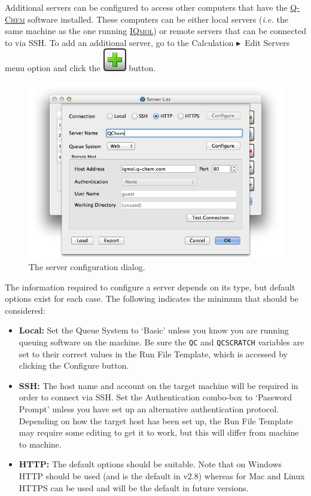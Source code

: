 \documentclass[a4paper,12pt]{article}
\newcommand{\qchem}{\href{http://q-chem.com}{{\scshape Q-Chem}}}
\newcommand{\iqmol}{\href{http://iqmol.org}{{\scshape IQmol}}}
\newcommand{\bt}{\ensuremath{\blacktriangleright}}
\begin{document}
Additional servers can be configured to access other computers that have the
\qchem{} software installed.  These computers can be either local servers
(\emph{i.e.} the same machine as the one running \iqmol{}) or remote servers
that can be connected to via SSH.  To add an additional server, go to the
Calculation \bt\ Edit Servers menu option and click the
\includegraphics[scale=0.40]{figures/PlusButton.png} button.  
\begin{figure}
\begin{center}
\includegraphics[scale=0.5]{figures/ServerDialog.png}
\caption{The server configuration dialog.}
\end{center}
\end{figure}

The information required to configure a server depends on its type, but default
options exist for each case.  The following indicates the minimum that should
be considered:

\begin{itemize}
\item {\bf Local:} Set the Queue System to `Basic'
      unless you know you are running queuing software on the machine.
      Be sure the {\tt QC} and {\tt QCSCRATCH} variables are set to their correct
	  values in the Run File Template, which is accessed by clicking the Configure
      button.
\item {\bf SSH:} The host name and account on the target machine will 
      be required in order to connect via SSH.  Set the Authentication combo-box to
      `Password Prompt' unless you have set up an alternative authentication protocol.
	  Depending on how the target host has been set up, the Run File Template
	  may require some editing to get it to work, but this will differ from
      machine to machine.
\item {\bf HTTP:} The default options should be suitable.  Note that on Windows
	  HTTP should be used (and is the default in v2.8) whereas for Mac and
      Linux HTTPS can be used and will be the default in future versions.  
\end{itemize}
\end{document}
